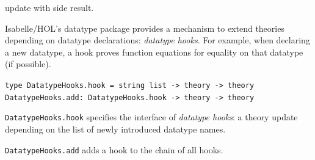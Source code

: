 \begin{isabellebody}
\begin{isamarkuptext}
\begin{description}
  \item {} update with side result.

  \end{description}%
\end{isamarkuptext}%
\isamarkuptrue%
%
\isamarkuptrue%
%
\begin{isamarkuptext}%
Isabelle/HOL's datatype package provides a mechanism to
  extend theories depending on datatype declarations:
  \emph{datatype hooks}.  For example, when declaring a new
  datatype, a hook proves function equations for equality on
  that datatype (if possible).%
\end{isamarkuptext}%
\isamarkuptrue%
%
\isadelimmlref
%
\endisadelimmlref
%
\isatagmlref
%
\begin{isamarkuptext}%
\begin{mldecls}
  \verb|type DatatypeHooks.hook = string list -> theory -> theory| \\
  \verb|DatatypeHooks.add: DatatypeHooks.hook -> theory -> theory|
  \end{mldecls}

  \begin{description}

  \item \verb|DatatypeHooks.hook| specifies the interface
     of \emph{datatype hooks}: a theory update
     depending on the list of newly introduced
     datatype names.

  \item \verb|DatatypeHooks.add| adds a hook to the
     chain of all hooks.


\end{description}
\end{isamarkuptext}
\end{isabellebody}
